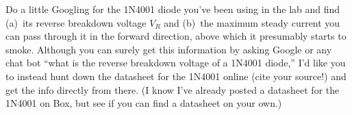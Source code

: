 \begin{Exercise}
Do a little Googling for the 1N4001 diode you've been using in the lab and find (a)~its reverse breakdown voltage $V_R$ and (b)~the maximum steady current you can pass through it in the forward direction, above which it presumably starts to smoke.  Although you can surely get this information by asking Google or any chat bot ``what is the reverse breakdown voltage of a 1N4001 diode,'' I'd like you to instead hunt down the datasheet for the 1N4001 online (cite your source!) and get the info directly from there.   (I know I've already posted a datasheet for the 1N4001 on Box, but see if you can find a datasheet on your own.)
\end{Exercise}


